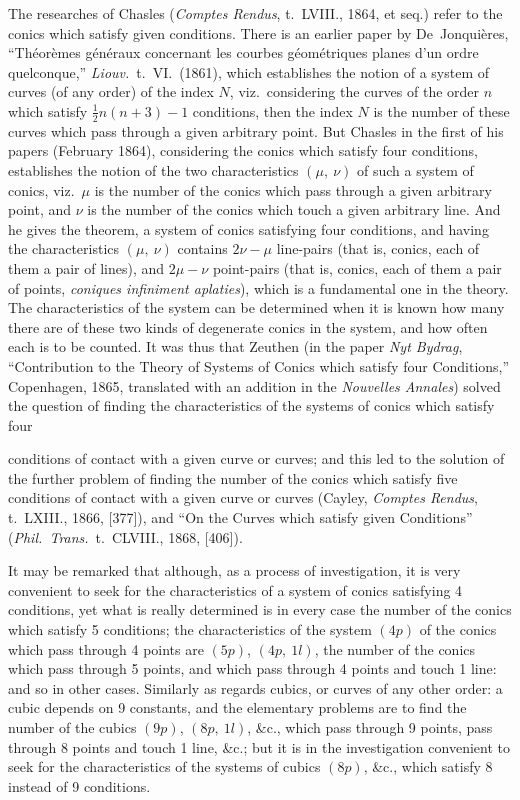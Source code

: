 \documentclass[12pt,a4paper,oneside]{book}
\begin{document}
The researches of Chasles (\textit{Comptes Rendus}, t.~LVIII., 1864, et seq.) refer to the conics which satisfy given conditions. There is an earlier paper by De~Jonqui\`eres, ``Th\'eor\`emes g\'en\'eraux concernant les courbes g\'eom\'etriques planes d'un ordre quelconque,'' \textit{Liouv.}\ t.~VI.\ (1861), which establishes the notion of a system of curves (of any order) of the index $N$, viz.\ considering the curves of the order $n$ which satisfy $\tfrac{1}{2}n(n+3)-1$ conditions, then the index $N$ is the number of these curves which pass through a given arbitrary point. But Chasles in the first of his papers (February 1864), considering the conics which satisfy four conditions, establishes the notion of the two characteristics $(\mu,\ \nu)$ of such a system of conics, viz.\ $\mu$ is the number of the conics which pass through a given arbitrary point, and $\nu$ is the number of the conics which touch a given arbitrary line. And he gives the theorem, a system of conics satisfying four conditions, and having the characteristics $(\mu,\ \nu)$ contains $2\nu-\mu$ line-pairs (that is, conics, each of them a pair of lines), and $2\mu-\nu$ point-pairs (that is, conics, each of them a pair of points, \textit{coniques infiniment aplaties}), which is a fundamental one in the theory. The characteristics of the system can be determined when it is known how many there are of these two kinds of degenerate conics in the system, and how often each is to be counted. It was thus that Zeuthen (in the paper \textit{Nyt Bydrag}, ``Contribution to the Theory of Systems of Conics which satisfy four Conditions,'' Copenhagen, 1865, translated with an addition in the \textit{Nouvelles Annales}) solved the question of finding the characteristics of the systems of conics which satisfy four

\newpage
conditions of contact with a given curve or curves; and this led to the solution of the further problem of finding the number of the conics which satisfy five conditions of contact with a given curve or curves (Cayley, \textit{Comptes Rendus}, t.~LXIII., 1866, [377]), and ``On the Curves which satisfy given Conditions'' (\textit{Phil.\ Trans.}\ t.~CLVIII., 1868, [406]).

It may be remarked that although, as a process of investigation, it is very convenient to seek for the characteristics of a system of conics satisfying 4 conditions, yet what is really determined is in every case the number of the conics which satisfy 5 conditions; the characteristics of the system $(4p)$ of the conics which pass through 4 points are $(5p)$, $(4p,\ 1l)$, the number of the conics which pass through 5 points, and which pass through 4 points and touch 1 line: and so in other cases. Similarly as regards cubics, or curves of any other order: a cubic depends on 9 constants, and the elementary problems are to find the number of the cubics $(9p)$, $(8p,\ 1l)$, \&c., which pass through 9 points, pass through 8 points and touch 1 line, \&c.; but it is in the investigation convenient to seek for the characteristics of the systems of cubics $(8p)$, \&c., which satisfy 8 instead of 9 conditions.
\end{document}
